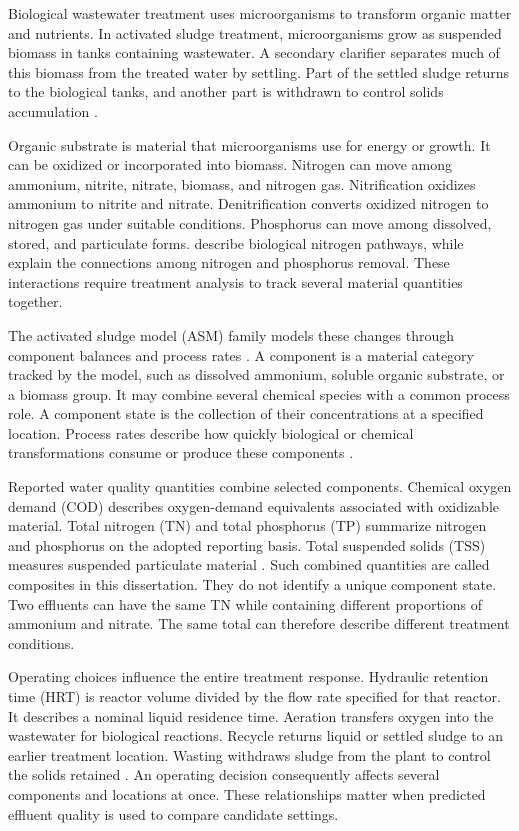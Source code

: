 Biological wastewater treatment uses microorganisms to transform organic matter and nutrients. In activated sludge treatment, microorganisms grow as suspended biomass in tanks containing wastewater. A secondary clarifier separates much of this biomass from the treated water by settling. Part of the settled sludge returns to the biological tanks, and another part is withdrawn to control solids accumulation \citep{Henze2008,Takacs1991}.

Organic substrate is material that microorganisms use for energy or growth. It can be oxidized or incorporated into biomass. Nitrogen can move among ammonium, nitrite, nitrate, biomass, and nitrogen gas. Nitrification oxidizes ammonium to nitrite and nitrate. Denitrification converts oxidized nitrogen to nitrogen gas under suitable conditions. Phosphorus can move among dissolved, stored, and particulate forms. \citet{Duan2022} describe biological nitrogen pathways, while \citet{Wentzel1992} explain the connections among nitrogen and phosphorus removal. These interactions require treatment analysis to track several material quantities together.

The activated sludge model (ASM) family models these changes through component balances and process rates \citep{Henze1987,Henze1999,Henze2006}. A component is a material category tracked by the model, such as dissolved ammonium, soluble organic substrate, or a biomass group. It may combine several chemical species with a common process role. A component state is the collection of their concentrations at a specified location. Process rates describe how quickly biological or chemical transformations consume or produce these components \citep{Henze2006}.

Reported water quality quantities combine selected components. Chemical oxygen demand (COD) describes oxygen-demand equivalents associated with oxidizable material. Total nitrogen (TN) and total phosphorus (TP) summarize nitrogen and phosphorus on the adopted reporting basis. Total suspended solids (TSS) measures suspended particulate material \citep{Henze2006,Henze2008}. Such combined quantities are called composites in this dissertation. They do not identify a unique component state. Two effluents can have the same TN while containing different proportions of ammonium and nitrate. The same total can therefore describe different treatment conditions.

Operating choices influence the entire treatment response. Hydraulic retention time (HRT) is reactor volume divided by the flow rate specified for that reactor. It describes a nominal liquid residence time. Aeration transfers oxygen into the wastewater for biological reactions. Recycle returns liquid or settled sludge to an earlier treatment location. Wasting withdraws sludge from the plant to control the solids retained \citep{Henze2008}. An operating decision consequently affects several components and locations at once. These relationships matter when predicted effluent quality is used to compare candidate settings.

